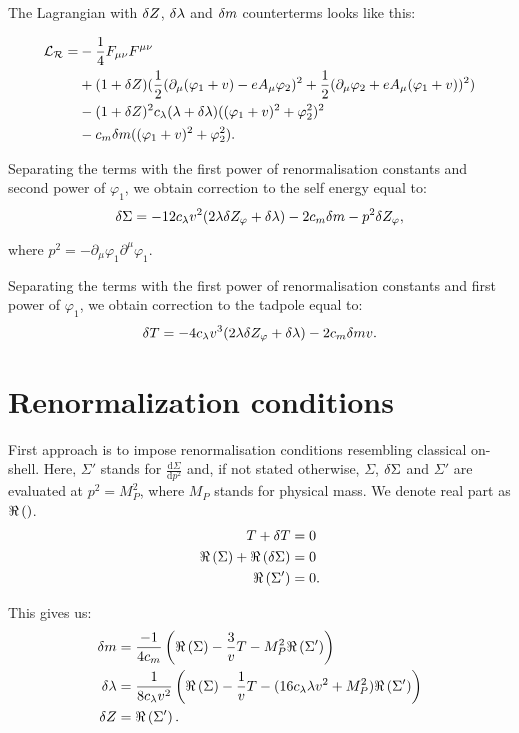 The Lagrangian with $\delta Z$, $\delta\lambda$ and $\delta m$ counterterms looks like this:

\begin{align}
\mathcal{L_R} = &-\frac{1}{4}F_{\mu\nu}F^{\mu\nu} \\
&+(1+ \delta Z)(\frac{1}{2}(\partial_\mu(\varphi_1+v) - eA_\mu\varphi_2)^2
+\frac{1}{2}(\partial_\mu\varphi_2+eA_\mu(\varphi_1+v))^2) \notag \\
&-(1+\delta Z)^2c_\lambda(\lambda+\delta\lambda)((\varphi_1+v)^2+\varphi_2^2)^2  \notag \\
&-c_m\delta m((\varphi_1+v)^2+\varphi_2^2).
\end{align}





Separating the terms with the first power of renormalisation constants and second power of 
$\varphi_1$, we obtain correction to the self energy equal to:
\begin{equation}
\delta\Sigma=-12c_\lambda v^2(2\lambda\delta Z_\varphi+\delta\lambda)-2c_m\delta m-p^2\delta Z_\varphi,
\end{equation}

where $p^2 = -\partial_\mu \varphi_1\partial^\mu\varphi_1$.


Separating the terms with the first power of renormalisation constants and first power of 
$\varphi_1$, we obtain correction to the tadpole equal to:
\begin{equation}
\delta T=-4c_\lambda v^3(2\lambda\delta Z_\varphi+\delta\lambda)-2c_m\delta m v.
\end{equation}
\section{Renormalization conditions}
First approach is to impose renormalisation conditions resembling classical on-shell.
Here, $\Sigma'$ stands for $\frac{\textrm{d}\Sigma}{\textrm{d}p^2}$ and, if not 
stated otherwise, 
$\Sigma$, $\delta\Sigma$ and $\Sigma'$ are evaluated at $p^2 = M_P^2$, where 
$M_P$ stands for physical mass. We denote real part as $\Re\left(\right)$.
\begin{align}
T+\delta T &= 0 \\
\Re\left(\Sigma\right) + \Re\left(\delta\Sigma\right) &= 0 \\
\Re\left(\Sigma'\right) &= 0.
\end{align}

This gives us:
\begin{align}
\delta m &= \frac{-1}{4c_m}\left(\Re\left(\Sigma\right)-\frac{3}{v}T-M_P^2\Re\left(\Sigma'\right)
\right)\\
\delta\lambda &= \frac{1}{8c_\lambda v^2}\left(\Re\left(\Sigma\right)-\frac{1}{v}T-(16c_\lambda\lambda v^2+M_P^2)
\Re\left(\Sigma'\right)
\right)\\
\delta Z &= \Re\left(\Sigma'\right).
\end{align}

